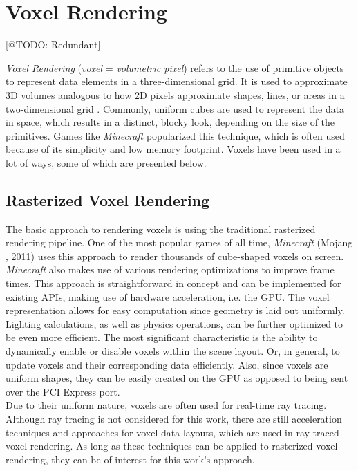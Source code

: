 \section{Voxel Rendering} \label{sec-voxel-rendering}
[@TODO: Redundant]

\noindent
\emph{Voxel Rendering} (\emph{voxel} = \emph{volumetric pixel}) refers to the use of primitive objects to 
represent data elements in a three-dimensional grid. It is used to approximate 3D volumes analogous to how 
2D pixels approximate shapes, lines, or areas in a two-dimensional grid \cite{MegaVoxels2023}. Commonly, 
uniform cubes are used to represent the data in space, which results in a distinct, blocky look, depending 
on the size of the primitives. Games like \emph{Minecraft} \cite{Mojang2024} popularized this technique, 
which is often used because of its simplicity and low memory footprint. Voxels have been used in a lot of 
ways, some of which are presented below.


\subsection*{Rasterized Voxel Rendering} \label{subsec-rasterized-voxel-rendering}

The basic approach to rendering voxels is using the traditional rasterized rendering pipeline.
One of the most popular games of all time, \emph{Minecraft} (Mojang \cite{Mojang2024}, 2011) uses 
this approach to render thousands of cube-shaped voxels on screen. \emph{Minecraft} also makes use 
of various rendering optimizations to improve frame times. This approach is straightforward in 
concept and can be implemented for existing \ac{API}s, making use of hardware acceleration, i.e. 
the \ac{GPU}. The voxel representation allows for easy computation since geometry is laid out 
uniformly. Lighting calculations, as well as physics operations, can be further optimized to 
be even more efficient. The most significant characteristic is the ability to dynamically enable or 
disable voxels within the scene layout. Or, in general, to update voxels and their corresponding 
data efficiently. Also, since voxels are uniform shapes, they can be easily created on the \ac{GPU} 
as opposed to being sent over the \ac{PCI Express} port. \\

\noindent
Due to their uniform nature, voxels are often used for real-time ray tracing. Although ray tracing 
is not considered for this work, there are still acceleration techniques and approaches for voxel 
data layouts, which are used in ray traced voxel rendering. As long as these techniques can be 
applied to rasterized voxel rendering, they can be of interest for this work's approach.


